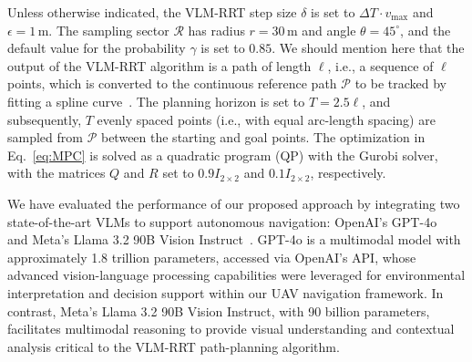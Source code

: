 Unless otherwise indicated, the VLM-RRT step size \( \delta \) is set to \( \Delta T \cdot v_{\text{max}} \) and \( \epsilon = 1 \, \text{m} \). The sampling sector \( \mathcal{R} \) has radius \( r = 30 \, \text{m} \) and angle \( \theta = 45^\circ \), and the default value for the probability \( \gamma \) is set to \( 0.85 \). We should mention here that the output of the VLM-RRT algorithm is a path of length \( \ell \), i.e., a sequence of \( \ell \) points, which is converted to the continuous reference path \( \mathcal{P} \) to be tracked by fitting a spline curve~\cite{wang2002arc}. The planning horizon is set to \( T = 2.5\ell \), and subsequently, \( T \) evenly spaced points (i.e., with equal arc-length spacing) are sampled from \( \mathcal{P} \) between the starting and goal points. The optimization in Eq.~\eqref{eq:MPC} is solved as a quadratic program (QP) with the Gurobi solver, with the matrices \( Q \) and \( R \) set to \( 0.9 I_{2 \times 2} \) and \( 0.1 I_{2 \times 2} \), respectively.

We have evaluated the performance of our proposed approach by integrating two state-of-the-art VLMs to support autonomous navigation: OpenAI's GPT-4o~\cite{achiam2023gpt} and Meta's Llama 3.2 90B Vision Instruct~\cite{dubey2024llama}. GPT-4o is a multimodal model with approximately 1.8 trillion parameters, accessed via OpenAI's API, whose advanced vision-language processing capabilities were leveraged for environmental interpretation and decision support within our UAV navigation framework. In contrast, Meta's Llama 3.2 90B Vision Instruct, with 90 billion parameters, facilitates multimodal reasoning to provide visual understanding and contextual analysis critical to the VLM-RRT path-planning algorithm.

